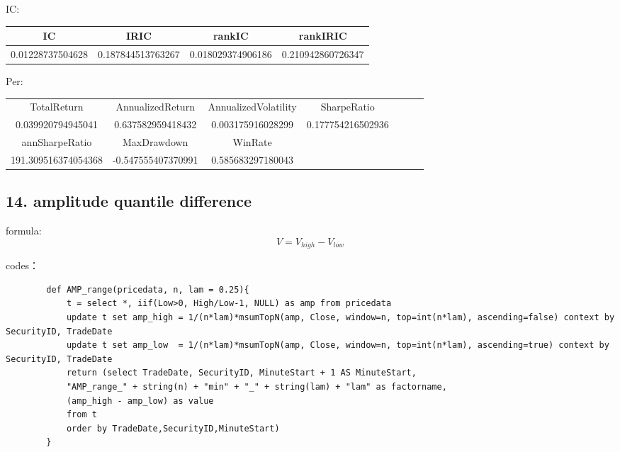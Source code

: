 \documentclass[10pt,a4paper]{article}
\begin{document}
	IC:
	\begin{table}[H]
		\begin{tabular}{|c|c|c|c|}
			\hline
			IC               & IRIC              & rankIC            & rankIRIC          \\ \hline
			0.01228737504628 & 0.187844513763267 & 0.018029374906186 & 0.210942860726347 \\ \hline
		\end{tabular}
	\end{table}
	
	Per:
	\begin{table}[H]
		\begin{tabular}{|c|c|c|llll}
			\cline{1-4}
			TotalReturn         & AnnualizedReturn   & AnnualizedVolatility & \multicolumn{1}{c|}{SharpeRatio}       &  &  &  \\ \cline{1-4}
			0.039920794945041   & 0.637582959418432  & 0.003175916028299    & \multicolumn{1}{c|}{0.177754216502936} &  &  &  \\ \cline{1-4}
			annSharpeRatio      & MaxDrawdown        & WinRate              &                                        &  &  &  \\ \cline{1-3}
			191.309516374054368 & -0.547555407370991 & 0.585683297180043    &                                        &  &  &  \\ \cline{1-3}
		\end{tabular}
	\end{table}
	
	\subsection*{14. amplitude quantile difference}
	formula:
\[ 	V={V_{high}}-{V_{low}} \]
	
	codes：
	\begin{lstlisting}
		def AMP_range(pricedata, n, lam = 0.25){
			t = select *, iif(Low>0, High/Low-1, NULL) as amp from pricedata
			update t set amp_high = 1/(n*lam)*msumTopN(amp, Close, window=n, top=int(n*lam), ascending=false) context by SecurityID, TradeDate
			update t set amp_low  = 1/(n*lam)*msumTopN(amp, Close, window=n, top=int(n*lam), ascending=true) context by SecurityID, TradeDate
			return (select TradeDate, SecurityID, MinuteStart + 1 AS MinuteStart, 
			"AMP_range_" + string(n) + "min" + "_" + string(lam) + "lam" as factorname, 
			(amp_high - amp_low) as value
			from t 
			order by TradeDate,SecurityID,MinuteStart)
		}
		
	\end{lstlisting}
		
\end{document}
